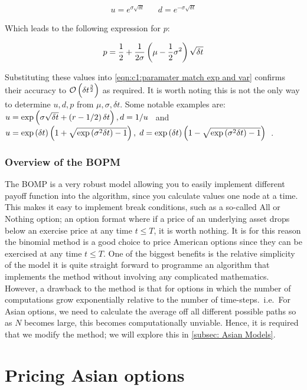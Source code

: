 \begin{align*}
    u = e^{\sigma\sqrt{\delta t}}
    &&
    d = e^{-\sigma\sqrt{\delta t}}
\end{align*}

Which leads to the following expression for \(p \):

\begin{equation*}
    p = \frac{1}{2} + \frac{1}{2\sigma}\left(\mu -\frac{1}{2}\sigma^2\right)\sqrt{\delta t}
\end{equation*}

Substituting these values into \autoref{eqn:c1:paramater match exp and var} confirms their accuracy to \(\mathcal{O}\left(\delta t^\frac{3}{2}\right)\) as required. It is worth noting this is not the only way to determine \(u, d, p\) from \(\mu, \sigma, \delta t\). Some notable examples are: \(u = \exp\left(\sigma\sqrt{\delta t}+\left(r-{1}/{2}\right)\delta t\right), d = {1}/{u}\)~\cite{higham2004introduction} and \(u = \exp\left(\delta t\right)\left(1+\sqrt{\exp\left(\sigma^2\delta t\right)-1}\right), \; d = \exp\left(\delta t\right)\left(1-\sqrt{\exp\left(\sigma^2\delta t\right)-1}\right)\)~\cite{wilmott1995mathematics}.

\subsubsection{Overview of the BOPM}

The BOMP is a very robust model allowing you to easily implement different payoff function into the algorithm, since you calculate values one node at a time. This makes it easy to implement break conditions, such as a so-called All or Nothing option; an option format where if a price of an underlying asset drops below an exercise price at any time \(t \leq T\), it is worth nothing. It is for this reason the binomial method is a good choice to price American options since they can be exercised at any time \(t \leq T\).
\nline{}
One of the biggest benefits is the relative simplicity of the model it is quite straight forward to programme an algorithm that implements the method without involving any complicated mathematics. However, a drawback to the method is that for options in which the number of computations grow exponentially relative to the number of time-steps.~i.e.~For Asian options, we need to calculate the average off all different possible paths so as \(N\) becomes large, this becomes computationally unviable. Hence, it is required that we modify the method; we will explore this in \autoref{subsec: Asian Models}.

\section{Pricing Asian options}\label{subsec: Asian Models}

